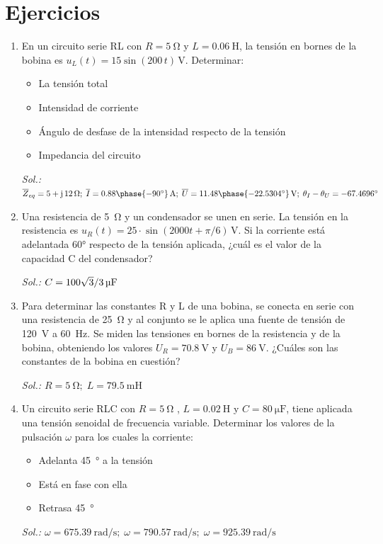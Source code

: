 \section*{Ejercicios}
	
\begin{enumerate}
		
\item En un circuito serie RL con $R=\qty{5}{\ohm}$ y $L=\qty{0.06}{\henry}$, la tensión en bornes de la bobina es $u_L(t)=15\sin(200\,t)\,\si{\volt}$. Determinar:
    \begin{itemize}
    \item La tensión total
    \item Intensidad de corriente
    \item Ángulo de desfase de la intensidad respecto de la tensión
    \item Impedancia del circuito
    \end{itemize}
  \emph{Sol.:\;
    $\overline{Z}_{eq}=5+\mathrm{j}\,12\,\si{\ohm};\;\overline{I}=0.88\phase{-90^\circ}\,\si{\ampere};\;\overline{U}=11.48\phase{-22.5304^\circ}\,\si{\volt};\; \theta_I - \theta_U = -67.4696^\circ$}

\item Una resistencia de \qty{5}{\ohm} y un condensador se unen en serie. La tensión en la resistencia es $u_R(t) = 25 \cdot \sin(2000t + \pi/6)\,\si{\volt}$. Si la corriente está adelantada \ang{60} respecto de la tensión aplicada, ¿cuál es el valor de la capacidad C del condensador?

\emph{Sol.:\;
    $C = \SI[parse-numbers = false]{100\sqrt{3}/3}{\micro\farad}$}
  

\item Para determinar las constantes R y L de una bobina, se conecta en serie con una resistencia de \qty{25}{\ohm} y al conjunto se le aplica una fuente de tensión de \qty{120}{\volt} a \qty{60}{\hertz}. Se miden las tensiones en bornes de la resistencia y de la bobina, obteniendo los valores $U_R = \qty{70.8}{\volt}$ y $U_B = \qty{86}{\volt}$. ¿Cuáles son las constantes de la bobina en cuestión?

  \emph{Sol.:\; $R = \qty{5}{\ohm};\; L = \qty{79.5}{\milli\henry}$}

\item Un circuito serie RLC con $R = \qty{5}{\ohm}$ , $L = \qty{0.02}{\henry}$ y $C=\qty{80}{\micro\farad}$, tiene aplicada una tensión senoidal de frecuencia variable. Determinar los valores de la pulsación $\omega$ para los cuales la corriente:
    \begin{itemize}
    \item Adelanta \qty{45}{\degree} a la tensión
    \item Está en fase con ella
    \item Retrasa \qty{45}{\degree}
    \end{itemize}
  \emph{Sol.:\;
    $\omega=\qty{675.39}{\radian\per\second};\; \omega=\qty{790.57}{\radian\per\second};\;
    \omega=\qty{925.39}{\radian\per\second}$}


\end{enumerate}
